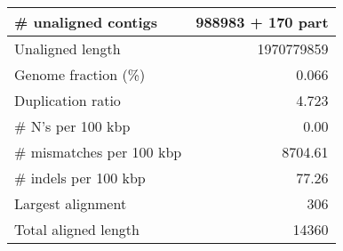 \documentclass[12pt,a4paper]{article}
\begin{document}
\begin{table}[ht]
\begin{center}
\begin{tabular}{|l*{1}{|r}|}
\# unaligned contigs & 988983 + 170 part \\ \hline
Unaligned length & 1970779859 \\ \hline
Genome fraction (\%) & 0.066 \\ \hline
Duplication ratio & 4.723 \\ \hline
\# N's per 100 kbp & 0.00 \\ \hline
\# mismatches per 100 kbp & 8704.61 \\ \hline
\# indels per 100 kbp & 77.26 \\ \hline
Largest alignment & 306 \\ \hline
Total aligned length & 14360 \\ \hline
\end{tabular}
\end{center}
\end{table}
\end{document}
